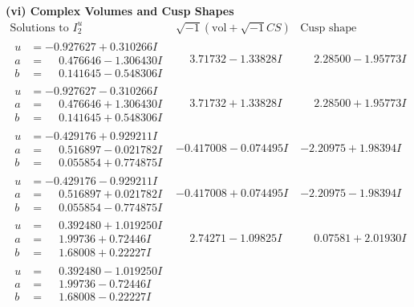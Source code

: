 \documentclass[1p]{elsarticle_modified}
\theoremstyle{definition}
\newcommand{\I}{\sqrt{-1}}
\begin{document}
\newpage\flushleft \textbf{(vi) Complex Volumes and Cusp Shapes}
$$\begin{array}{c|c|c}  
\text{Solutions to }I^u_{2}& \I (\text{vol} + \sqrt{-1}CS) & \text{Cusp shape}\\
 \hline 
\begin{aligned}
u &= -0.927627 + 0.310266 I \\
a &= \phantom{-}0.476646 - 1.306430 I \\
b &= \phantom{-}0.141645 - 0.548306 I\end{aligned}
 & \phantom{-}3.71732 - 1.33828 I & \phantom{-}2.28500 - 1.95773 I \\ \hline\begin{aligned}
u &= -0.927627 - 0.310266 I \\
a &= \phantom{-}0.476646 + 1.306430 I \\
b &= \phantom{-}0.141645 + 0.548306 I\end{aligned}
 & \phantom{-}3.71732 + 1.33828 I & \phantom{-}2.28500 + 1.95773 I \\ \hline\begin{aligned}
u &= -0.429176 + 0.929211 I \\
a &= \phantom{-}0.516897 - 0.021782 I \\
b &= \phantom{-}0.055854 + 0.774875 I\end{aligned}
 & -0.417008 - 0.074495 I & -2.20975 + 1.98394 I \\ \hline\begin{aligned}
u &= -0.429176 - 0.929211 I \\
a &= \phantom{-}0.516897 + 0.021782 I \\
b &= \phantom{-}0.055854 - 0.774875 I\end{aligned}
 & -0.417008 + 0.074495 I & -2.20975 - 1.98394 I \\ \hline\begin{aligned}
u &= \phantom{-}0.392480 + 1.019250 I \\
a &= \phantom{-}1.99736 + 0.72446 I \\
b &= \phantom{-}1.68008 + 0.22227 I\end{aligned}
 & \phantom{-}2.74271 - 1.09825 I & \phantom{-}0.07581 + 2.01930 I \\ \hline\begin{aligned}
u &= \phantom{-}0.392480 - 1.019250 I \\
a &= \phantom{-}1.99736 - 0.72446 I \\
b &= \phantom{-}1.68008 - 0.22227 I\end{aligned}

\end{array}$$
\end{document}
